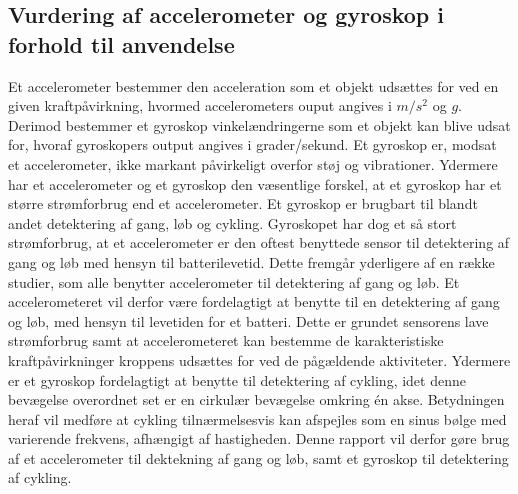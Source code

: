 \subsection{Vurdering af accelerometer og gyroskop i forhold til anvendelse}
Et accelerometer bestemmer den acceleration som et objekt udsættes for ved en given kraftpåvirkning, hvormed accelerometers ouput angives i $m/s^2$ og $g$. Derimod bestemmer et gyroskop vinkelændringerne som et objekt kan blive udsat for, hvoraf gyroskopers output angives i grader/sekund. Et gyroskop er, modsat et accelerometer, ikke markant påvirkeligt overfor støj og vibrationer. \citep{Goodrich2013,TittertonWeston2004,LuingeVeltink2005} \newline
Ydermere har et accelerometer og et gyroskop den væsentlige forskel, at et gyroskop har et større strømforbrug end et accelerometer.  Et gyroskop er brugbart til blandt andet detektering af gang, løb og cykling. Gyroskopet har dog et så stort strømforbrug, at et accelerometer er den oftest benyttede sensor til detektering af gang og løb med hensyn til batterilevetid. Dette fremgår yderligere af en række studier, som alle benytter accelerometer til detektering af gang og løb. \citep{Rueterbories2010,Sparkfun,ClelandKikhia2013} \newline
Et accelerometeret vil derfor være fordelagtigt at benytte til en detektering af gang og løb, med hensyn til levetiden for et batteri. Dette er grundet sensorens lave strømforbrug samt at accelerometeret kan bestemme de karakteristiske kraftpåvirkninger kroppens udsættes for ved de pågældende aktiviteter. Ydermere er et gyroskop fordelagtigt at benytte til detektering af cykling, idet denne bevægelse overordnet set er en cirkulær bevægelse omkring én akse. Betydningen heraf vil medføre at cykling tilnærmelsesvis kan afspejles som en sinus bølge med varierende frekvens, afhængigt af hastigheden. \newline
Denne rapport vil derfor gøre brug af et accelerometer til dektekning af gang og løb, samt et gyroskop til detektering af cykling. 
